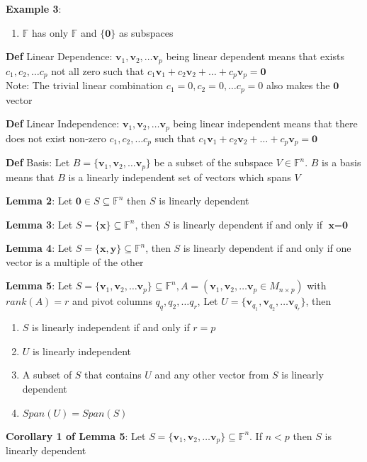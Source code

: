 \documentclass[11pt,notitlepage]{report}
\newcommand{\bb}[1]{\ensuremath{\mathbb{#1}}}
\newcommand{\tbf}[1]{\textbf{#1}}
\begin{document}
\textbf{Example 3}:
\begin{enumerate}[label=(\alph*)]
    \item $\bb F$ has only $\bb F$ and $\{\tbf 0\}$ as subspaces
\end{enumerate}

\textbf{Def} Linear Dependence: $\tbf v_1, \tbf v_2, \dots \tbf v_p$ being linear dependent means that exists $c_1, c_2, \dots c_p$ not all zero such that $c_1\tbf v_1 + c_2\tbf v_2 + \dots + c_p\tbf v_p = \tbf 0$\\
\hspace*{5mm} Note: The trivial linear combination $c_1 = 0, c_2 = 0, \dots c_p = 0$ also makes the $\tbf 0$ vector

\textbf{Def} Linear Independence: $\tbf v_1, \tbf v_2, \dots \tbf v_p$ being linear independent means that there does not exist non-zero $c_1, c_2, \dots c_p$ such that $c_1\tbf v_1 + c_2\tbf v_2 + \dots + c_p\tbf v_p = \tbf 0$

\newpage
\textbf{Def} Basis: Let $B = \{\tbf v_1, \tbf v_2, \dots \tbf v_p\}$ be a subset of the subspace $V \in \bb F^n$. $B$ is a basis means that $B$ is a linearly independent set of vectors which spans $V$

\textbf{Lemma 2}: Let $\tbf 0 \in S \subseteq \bb F^n$ then $S$ is linearly dependent

\textbf{Lemma 3}: Let $S = \{\tbf x\} \subseteq \bb F^n$, then $S$ is linearly dependent if and only if $\tbf x = \tbf 0$

\textbf{Lemma 4}: Let $S = \{\tbf x, \tbf y\} \subseteq \bb F^n$, then $S$ is linearly dependent if and only if one vector is a multiple of the other

\textbf{Lemma 5}: Let $S = \{\tbf v_1, \tbf v_2, \dots \tbf v_p\} \subseteq \bb F^n, A = (\tbf v_1, \tbf v_2, \dots \tbf v_p \in M_{n \times p})$ with $rank(A) = r$ and pivot columns $q_q, q_2, \dots q_r$, Let $U = \{\tbf v_{q_1}, \tbf v_{q_2}, \dots \tbf v_{q_r}\}$, then
\begin{enumerate}[label=(\alph*)]
    \item $S$ is linearly independent if and only if $r= p$
    \item $U$ is linearly independent
    \item A subset of $S$ that contains $U$ and any other vector from $S$ is linearly dependent
    \item $Span(U) = Span(S)$
\end{enumerate}

\textbf{Corollary 1 of Lemma 5}: Let $S = \{\tbf v_1, \tbf v_2, \dots \tbf v_p\} \subseteq \bb F^n$. If $n<p$ then $S$ is linearly dependent
\end{document}
